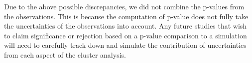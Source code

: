 % 



Due to the above possible discrepancies, we did not combine the p-values from
the observations.
This is because the computation of p-value does not fully
take the uncertainties of the observations into account. 
Any future studies that wish to claim significance or rejection based on a 
p-value comparison to a simulation will 
need to carefully track down and simulate the contribution of uncertainties 
from each aspect of the cluster analysis. 



